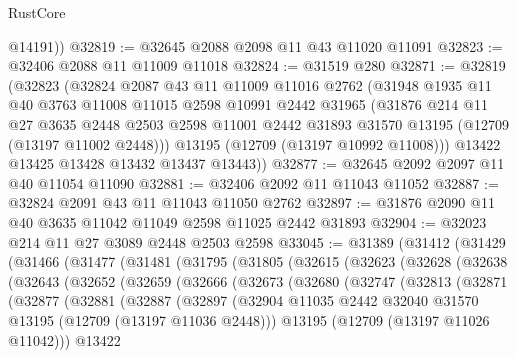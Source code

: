 \begin{lexlean}{RustCore}
\begin{coremodule}
        @14191))
@32819 := @32645 @2088 @2098 @11 @43 @11020 @11091
@32823 := @32406 @2088 @11 @11009 @11018
@32824 := @31519 @280
@32871 := @32819
    (@32823
      (@32824
        @2087
        @43
        @11
        @11009
        @11016
        @2762
        (@31948
          @1935
          @11
          @40
          @3763
          @11008
          @11015
          @2598
          @10991
          @2442
          @31965
          (@31876
            @214
            @11
            @27
            @3635
            @2448
            @2503
            @2598
            @11001
            @2442
            @31893
            @31570
            @13195
            (@12709 (@13197 @11002 @2448)))
          @13195
          (@12709 (@13197 @10992 @11008)))
        @13422
        @13425
        @13428
        @13432
        @13437
        @13443))
@32877 := @32645 @2092 @2097 @11 @40 @11054 @11090
@32881 := @32406 @2092 @11 @11043 @11052
@32887 := @32824 @2091 @43 @11 @11043 @11050 @2762
@32897 := @31876 @2090 @11 @40 @3635 @11042 @11049 @2598 @11025 @2442 @31893
@32904 := @32023 @214 @11 @27 @3089 @2448 @2503 @2598
@33045 := @31389
    (@31412
      (@31429
        (@31466
          (@31477
            (@31481
              (@31795
                (@31805
                  (@32615
                    (@32623
                      (@32628
                        (@32638
                          (@32643
                            (@32652
                              (@32659
                                (@32666
                                  (@32673
                                    (@32680
                                      (@32747
                                        (@32813
                                          (@32871
                                            (@32877
                                              (@32881
                                                (@32887
                                                  (@32897
                                                    (@32904
                                                      @11035
                                                      @2442
                                                      @32040
                                                      @31570
                                                      @13195
                                                      (@12709 (@13197 @11036 @2448)))
                                                    @13195
                                                    (@12709 (@13197 @11026 @11042)))
                                                  @13422

\end{coremodule}
\end{lexlean}

